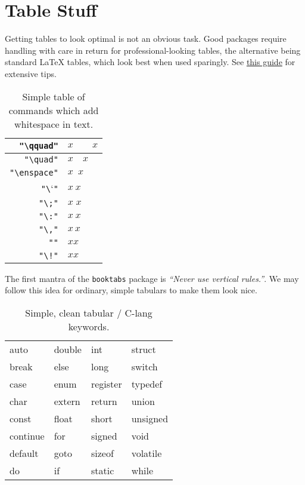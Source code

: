 \section{Table Stuff}
\label{sec:tables}

Getting tables to look optimal is not an obvious task.
Good packages require handling with care in return for professional-looking tables, the alternative being standard \LaTeX{} tables, which look best when used sparingly.
See \href{https://people.inf.ethz.ch/markusp/teaching/guides/guide-tables.pdf}{this guide} for extensive tips.

\def\testS#1{x#1x}
\begin{table}[H]
	\centering
	\caption{Simple table of commands which add whitespace in text.}
	\label{tab:spaces}
	\begin{tabular}{| r | l |}
	\hline
	\verb`"\qquad"` & $\testS{\qquad}$ \\
	\hline
	\verb`"\quad"` & $\testS{\quad}$ \\
	\hline
	\verb`"\enspace"` & $\testS{\enspace}$ \\
	\hline
	\verb`"\`\textvisiblespace{}\verb`"` & $\testS{\ }$ \\
	\hline
	\verb`"\;"` & $\testS{\;}$ \\
	\hline
	\verb`"\:"` & $\testS{\:}$ \\
	\hline
	\verb`"\,"` & $\testS{\,}$ \\
	\hline
	\verb`""` & $\testS{}$ \\
	\hline
	\verb`"\!"` & $\testS{\!}$ \\
	\hline
	\end{tabular}
\end{table}

The first mantra of the \texttt{booktabs} package is \textit{``Never use vertical rules.''}.
We may follow this idea for ordinary, simple tabulars to make them look nice.
\begin{table}[H]
	\centering
	\caption{Simple, clean tabular / C-lang keywords.}
	\label{tab:lessismore}
	\begin{tabular}{llll}
    \hline
    	auto & double & int & struct \\
    	break & else & long & switch \\
    	case & enum & register & typedef \\
    	char & extern & return & union \\
    	const & float & short & unsigned \\
    	continue & for & signed & void \\
    	default & goto & sizeof & volatile \\
    	do & if & static & while \\
    \hline
	\end{tabular}
\end{table}

